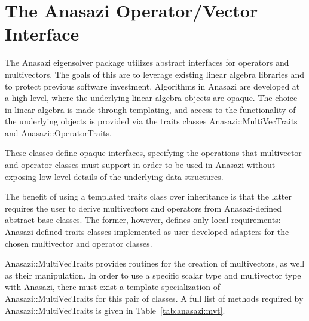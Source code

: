 \section{The Anasazi Operator/Vector Interface}
\label{sec:anasazi:opvec}

The Anasazi eigensolver package utilizes abstract interfaces for operators and
multivectors. The goals of this are to leverage existing linear algebra libraries and to
protect previous software investment. Algorithms in Anasazi are developed at a high-level,
where the underlying linear algebra objects are opaque. The choice in linear algebra is
made through templating, and access to the functionality of the underlying objects is
provided via the traits classes Anasazi::MultiVecTraits and Anasazi::OperatorTraits.

These classes define opaque interfaces, specifying the operations that multivector and
operator classes must support in order to be used in Anasazi without exposing low-level
details of the underlying data structures.

The benefit of using a templated traits class over inheritance is that the latter requires
the user to derive multivectors and operators from Anasazi-defined abstract
base classes. The former, however, defines only local requirements: Anasazi-defined traits
classes implemented as user-developed adapters for the chosen multivector and operator
classes.

Anasazi::MultiVecTraits provides routines for the creation of multivectors, as well as
their manipulation. In order to use a specific scalar type and multivector type with
Anasazi, there must exist a template specialization of Anasazi::MultiVecTraits for this
pair of classes. A full list of methods required by Anasazi::MultiVecTraits is given in
Table~\ref{tab:anasazi:mvt}.

